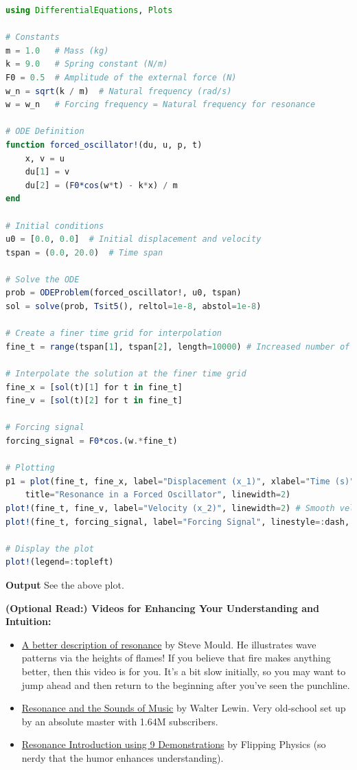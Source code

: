 \begin{lstlisting}[language=Julia,style=mystyle]
using DifferentialEquations, Plots

# Constants
m = 1.0   # Mass (kg)
k = 9.0   # Spring constant (N/m)
F0 = 0.5  # Amplitude of the external force (N)
w_n = sqrt(k / m)  # Natural frequency (rad/s)
w = w_n   # Forcing frequency = Natural frequency for resonance

# ODE Definition
function forced_oscillator!(du, u, p, t)
    x, v = u
    du[1] = v
    du[2] = (F0*cos(w*t) - k*x) / m
end

# Initial conditions
u0 = [0.0, 0.0]  # Initial displacement and velocity
tspan = (0.0, 20.0)  # Time span

# Solve the ODE
prob = ODEProblem(forced_oscillator!, u0, tspan)
sol = solve(prob, Tsit5(), reltol=1e-8, abstol=1e-8)

# Create a finer time grid for interpolation
fine_t = range(tspan[1], tspan[2], length=10000) # Increased number of points for finer interpolation

# Interpolate the solution at the finer time grid
fine_x = [sol(t)[1] for t in fine_t]
fine_v = [sol(t)[2] for t in fine_t]

# Forcing signal
forcing_signal = F0*cos.(w.*fine_t)

# Plotting
p1 = plot(fine_t, fine_x, label="Displacement (x_1)", xlabel="Time (s)", ylabel="Displacement (m) / Velocity (m/s)", 
    title="Resonance in a Forced Oscillator", linewidth=2)
plot!(fine_t, fine_v, label="Velocity (x_2)", linewidth=2) # Smooth velocity curve
plot!(fine_t, forcing_signal, label="Forcing Signal", linestyle=:dash, color=:black, lw=3) # Forcing signal

# Display the plot
plot!(legend=:topleft)
\end{lstlisting}
\textbf{Output} 
See the above plot.

\bigskip
\textbf{(Optional Read:) Videos for Enhancing Your Understanding and Intuition:}
\begin{itemize}
    \item \href{https://youtu.be/dihQuwrf9yQ}{A better description of resonance} by Steve Mould. He illustrates wave patterns via the heights of flames! If you believe that fire makes anything better, then this video is for you. It's a bit slow initially, so you may want to jump ahead and then return to the beginning after you've seen the punchline. 

    \item \href{https://youtu.be/f4M-6tWtkoA}{Resonance and the Sounds of Music} by Walter Lewin. Very old-school set up by an absolute master with 1.64M subscribers. 

    \item \href{https://youtu.be/B_u3sGbpM8M}{Resonance Introduction using 9 Demonstrations} by Flipping Physics (so nerdy that the humor enhances understanding).
\end{itemize}
    


